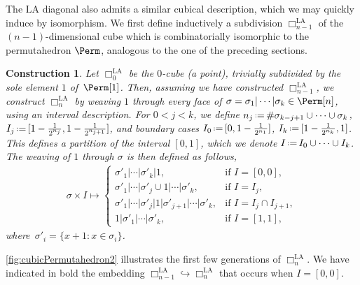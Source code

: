 \documentclass{amsart}
\newtheorem{construction}[theorem]{Construction}
\theoremstyle{definition}
\newcommand{\eqdef}{\mbox{\,\raisebox{0.2ex}{\scriptsize\ensuremath{\mathrm:}}\ensuremath{=}\,}} %
\newcommand{\card}[1]{\##1} %
\newcommand{\LA}{\mathrm{LA}}
\newcommand{\divcube}[1]{\Box_{#1}}
\begin{document}
The $\LA$ diagonal also admits a similar cubical description, which we may quickly induce by isomorphism.
We first define inductively a subdivision $\divcube{n-1}^{\LA}$ of the $(n-1)$-dimensional cube which is combinatorially isomorphic to the permutahedron $\Perm$, analogous to the one of the preceding sections. 

\begin{construction}
\label{constr:cubicPermutahedron2}
Let $\divcube{0}^{\LA}$ be the $0$-cube (a point), trivially subdivided by the sole element $1$ of~$\Perm[1]$.
Then, assuming we have constructed $\divcube{n-1}^{\LA}$, we construct $\divcube{n}^{\LA}$ by weaving $1$ through every face of $\sigma = \sigma_1| \cdots |\sigma_k \in \Perm[n]$, using an interval description.
For $0<j<k$, we define
$n_j \eqdef \card{\sigma_{k-j+1}\cup\dots\cup \sigma_k}$, $I_j \eqdef [1 - \frac{1}{2^{n_j}}, 1 - \frac{1}{2^{n_{j+1}}}]$, and boundary cases $I_0\eqdef [0,1 - \frac{1}{2^{n_1}}]$, ${I_k\eqdef [1 - \frac{1}{2^{n_k}},1]}$.
This defines a partition of the interval $[0,1]$, which we denote $I \eqdef I_0 \cup \dots \cup I_k$.
The weaving of $1$ through $\sigma$ is then defined as follows,
\begin{align}
\label{eq:In LA inductive def}
	\sigma \times I \mapsto 
	\begin{cases}
		\sigma'_1| \cdots |\sigma'_k| 1, & \text{if } I = [0, 0], \\
		\sigma'_1| \cdots |\sigma'_j \cup 1| \cdots |\sigma'_k, & \text{if } I = I_j, \\
		\sigma'_1| \cdots |\sigma'_j|1|\sigma'_{j+1}| \cdots |\sigma'_k, & \text{if } I = I_j \cap I_{j+1}, \\
		1|\sigma'_1| \cdots |\sigma'_k, & \text{if } I = [1, 1],
	\end{cases}
\end{align}
where~$\sigma'_i = \{x+1:x\in \sigma_i\}$.
\end{construction}

\cref{fig:cubicPermutahedron2} illustrates the first few generations of $\divcube{n}^{\LA}$.
We have indicated in bold the embedding ${\divcube{n-1}^{\LA}\hookrightarrow \divcube{n}^{\LA}}$ that occurs when $I = [0, 0]$.
\end{document}
